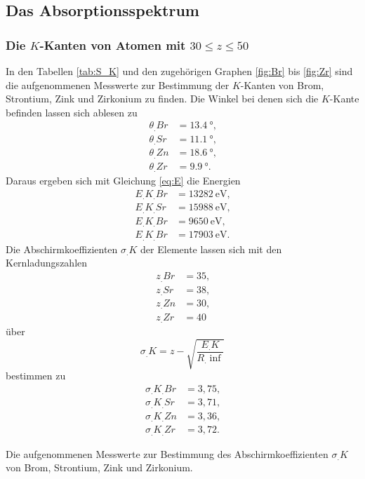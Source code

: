\subsection{Das Absorptionsspektrum}
\subsubsection{Die $K$-Kanten von Atomen mit $30\leq z\leq 50$}
In den Tabellen \ref{tab:S_K} und den zugehörigen Graphen \ref{fig:Br} bis \ref{fig:Zr} sind die aufgenommenen Messwerte zur Bestimmung der $K$-Kanten von Brom, Strontium, Zink und Zirkonium zu finden.
Die Winkel bei denen sich die $K$-Kante befinden lassen sich ablesen zu
\begin{align*}
\theta_.{Br} &= \SI{13,4}{\degree}\text{,}\\
\theta_.{Sr} &= \SI{11,1}{\degree}\text{,}\\
\theta_.{Zn} &= \SI{18,6}{\degree}\text{,}\\
\theta_.{Zr} &= \SI{9,9}{\degree}\text{.}
\end{align*}
Daraus ergeben sich mit Gleichung \eqref{eq:E} die Energien
\begin{align*}
E_.{K_.{Br}} &= \SI{13282}{\eV}\text{,}\\
E_.{K_.{Sr}} &= \SI{15988}{\eV}\text{,}\\
E_.{K_.{Br}} &= \SI{9650}{\eV}\text{,}\\
E_.{K_.{Br}} &= \SI{17903}{\eV}\text{.}
\end{align*}
Die Abschirmkoeffizienten $\sigma_.K$ der Elemente lassen sich
mit den Kernladungszahlen
\begin{align*}
z_.{Br} &= 35\text{,}\\
z_.{Sr} &= 38\text{,}\\
z_.{Zn} &= 30\text{,}\\
z_.{Zr} &= 40
\end{align*}
über
\[
\sigma_.K =z - \sqrt{\frac{E_.K}{R_.{\inf}}}
\]
bestimmen zu
\begin{align*}
\sigma_.{K_.{Br}}&=3,75\text{,}\\
\sigma_.{K_.{Sr}}&=3,71\text{,}\\
\sigma_.{K_.{Zn}}&=3,36\text{,}\\
\sigma_.{K_.{Zr}}&=3,72\text{.}
\end{align*}

\begin{table}
\centering
\caption{Die aufgenommenen Messwerte zur Bestimmung des Abschirmkoeffizienten $\sigma_.K$ von Brom, Strontium, Zink und Zirkonium.}




\label{tab:S_K}
\end{table}

